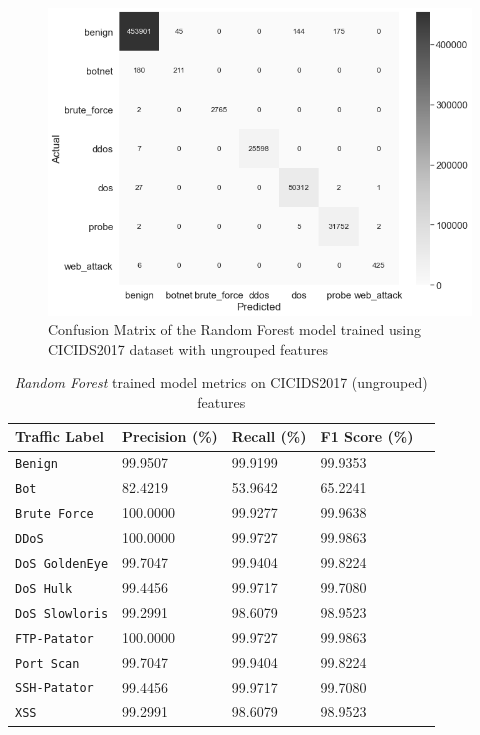 \begin{figure}[h!]
   \centering
   \includegraphics[scale=0.6]{assets/figures/chapter3/grouped_confusion_matrix.png}
   \caption{Confusion Matrix of the Random Forest model trained using CICIDS2017 dataset with ungrouped features}
   \label{fig:ungrouped-confusion-matrix}
\end{figure}

\begin{table}[h!]
   \centering
   \begin{tabular}{l|llll}
       \toprule 
       Traffic Label & Precision (\%) & Recall (\%) & F1 Score (\%) \\
       \midrule
       \rowcolor{black!10} \texttt{Benign} & 99.9507 & 99.9199 & 99.9353 \\
       \texttt{Bot} & 82.4219 & 53.9642 & 65.2241 \\
       \rowcolor{black!10} \texttt{Brute Force} & 100.0000 & 99.9277 & 99.9638 \\
       \texttt{DDoS} & 100.0000 & 99.9727 & 99.9863 \\
       \rowcolor{black!10} \texttt{DoS GoldenEye} & 99.7047 & 99.9404 & 99.8224 \\
       \texttt{DoS Hulk} & 99.4456 & 99.9717 & 99.7080 \\
       \rowcolor{black!10} \texttt{DoS Slowloris} & 99.2991 & 98.6079 & 98.9523 \\
       \texttt{FTP-Patator} & 100.0000 & 99.9727 & 99.9863 \\
       \rowcolor{black!10} \texttt{Port Scan} & 99.7047 & 99.9404 & 99.8224 \\
       \texttt{SSH-Patator} & 99.4456 & 99.9717 & 99.7080 \\
       \rowcolor{black!10} \texttt{XSS} & 99.2991 & 98.6079 & 98.9523 \\
       \bottomrule
   \end{tabular}
   \caption{\textit{Random Forest} trained model metrics on CICIDS2017 (ungrouped) features}
   \label{tab:ungrouped-metrics}
\end{table}

